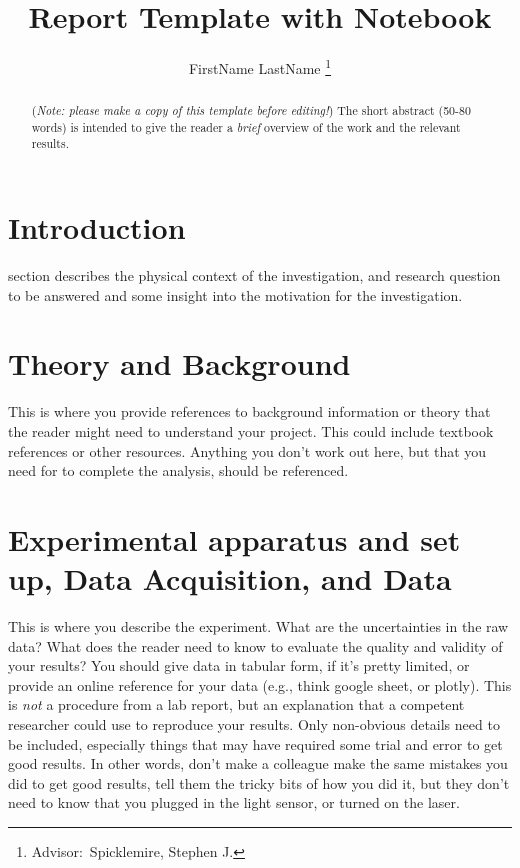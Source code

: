 \documentclass[journal, a4paper]{IEEEtran}
\begin{document}
	\title{Report Template with Notebook}
	\author{FirstName LastName
	\thanks{Advisor:~Spicklemire, Stephen J.}}
	\maketitle

\begin{abstract}
(\textit{Note: please make a copy of this template before editing!}) The short abstract (50-80 words) is intended to give the reader a {\it brief} overview of the work and the relevant results. 
\end{abstract}

\section{Introduction}
	 section describes the physical context of the investigation, and research question to be answered and some insight into the motivation for the investigation.
\section{Theory and Background}
	This is where you provide references to background information or theory that the reader might need to understand your project. This could include textbook references or other
    resources. Anything you don't work out here, but that you need for to complete
    the analysis, should be referenced.

\section{Experimental apparatus and set up, Data Acquisition, and Data}
	This is where you describe the experiment. What are the uncertainties in the raw data? What does the reader need to know to evaluate the quality and validity of your results? 
	You should give data in tabular form, if it's pretty limited, or 
    provide an online reference for your data (e.g., think google sheet, or plotly).
    This is {\it not} a procedure from a lab report, but an explanation that a
    competent researcher could use to reproduce your results. Only non-obvious details
    need to be included, especially things that may have required some trial and error to 
    get good results. In other words, don't make a colleague make the same mistakes
    you did to get good results, tell them the tricky bits of how you did it, but 
    they don't need to know that you plugged in the light sensor, or turned on the laser.
    
\end{document}
